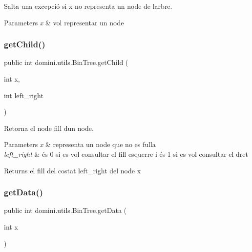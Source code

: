 Salta una excepció si x no representa un node de l\textquotesingle{}arbre. 


\begin{DoxyParams}{Parameters}
{\em x} & vol representar un node \\
\hline
\end{DoxyParams}
\mbox{\label{classdomini_1_1utils_1_1BinTree_aee1ed36b9433869f94a6ee8a6815d872}} 
\subsubsection{\texorpdfstring{get\+Child()}{getChild()}}
{\footnotesize\ttfamily public int domini.\+utils.\+Bin\+Tree.\+get\+Child (\begin{DoxyParamCaption}\item[{int}]{x,  }\item[{int}]{left\+\_\+right }\end{DoxyParamCaption})\hspace{0.3cm}{\ttfamily [inline]}}



Retorna el node fill d\textquotesingle{}un node. 


\begin{DoxyParams}{Parameters}
{\em x} & representa un node que no es fulla \\
\hline
{\em left\+\_\+right} & és 0 si es vol consultar el fill esquerre i és 1 si es vol consultar el dret \\
\hline
\end{DoxyParams}
\begin{DoxyReturn}{Returns}
el fill del costat left\+\_\+right del node x 
\end{DoxyReturn}
\mbox{\label{classdomini_1_1utils_1_1BinTree_ad8734786aa8ba40815e4b782264aef64}} 
\subsubsection{\texorpdfstring{get\+Data()}{getData()}}
{\footnotesize\ttfamily public int domini.\+utils.\+Bin\+Tree.\+get\+Data (\begin{DoxyParamCaption}\item[{int}]{x }\end{DoxyParamCaption})\hspace{0.3cm}{\ttfamily [inline]}}



